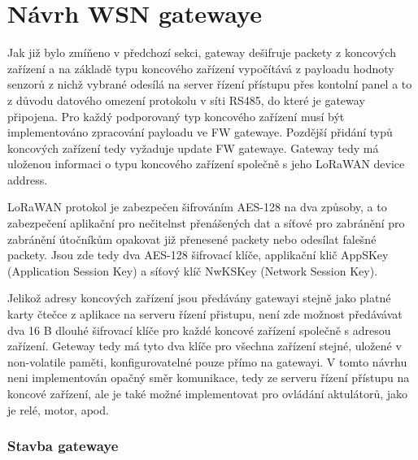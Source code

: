 \section{Návrh WSN gatewaye}
Jak již bylo zmíňeno v předchozí sekci, gateway dešifruje packety z koncových zařízení a na základě typu koncového zařízení vypočítává z payloadu hodnoty senzorů z nichž vybrané odesílá na server řízení přístupu přes kontolní panel a to z důvodu datového omezení protokolu v síti RS485, do které je gateway připojena.
Pro každý podporovaný typ koncového zařízení musí být implementováno zpracování payloadu ve FW gatewaye. Pozdější přidání typů koncových zařízení tedy vyžaduje update FW gatewaye.
Gateway tedy má uloženou informaci o typu koncového zařízení společně s jeho LoRaWAN device address.

LoRaWAN protokol je zabezpečen šifrováním AES-128 na dva způsoby, a to zabezpečení aplikační pro nečitelnst přenášených dat a síťové pro zabránění pro zabránění útočníkům opakovat již přenesené packety nebo odesílat falešné packety. Jsou zde tedy dva AES-128 šifrovací klíče, applikační klič AppSKey (Application Session Key) a síťový klíč NwKSKey (Network Session Key).

Jelikož adresy koncových zařízení jsou předávány gatewayi stejně jako platné karty čtečce z aplikace na serveru řízení přistupu, není zde možnost předávávat dva 16 B dlouhé šifrovací klíče pro každé koncové zařízení společně s adresou zařízení. Geteway tedy má tyto dva klíče pro všechna zařízení stejné, uložené v non-volatile paměti, konfigurovatelné pouze přímo na gatewayi.
V tomto návrhu neni implementován opačný směr komunikace, tedy ze serveru řízení přístupu na koncové zařízení, ale je také možné implementovat pro ovládání aktulátorů, jako je relé, motor, apod.

\subsubsection{Stavba gatewaye}


